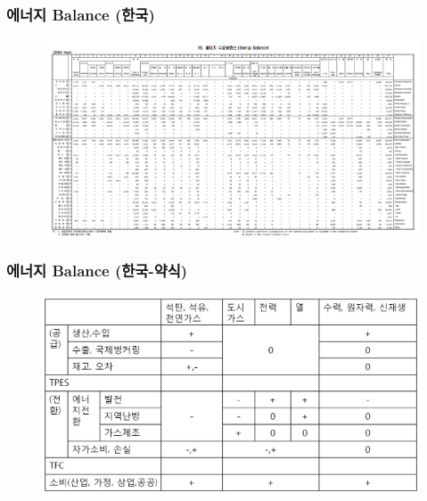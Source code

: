 \documentclass[10pt,compress,slidetop,%
			   hyperref={unicode},xcolor={svgnames},%
			   t]{beamer}
\begin{document}
%
\begin{frame}
	\frametitle{에너지 Balance (한국)}
	  	\begin{figure}
	\centering
	 \includegraphics[width=1.00\textwidth]{EBK.png}
	\label{IEA world balance}
	\end{figure}	
	
\end{frame}

%
\begin{frame}
	\frametitle{에너지 Balance (한국-약식)}
	  	\begin{figure}
	\centering
	 \includegraphics[width=1.00\textwidth]{EBKS.png}
	\label{IEA world balance}
	\end{figure}	
	
\end{frame}
\end{document}
